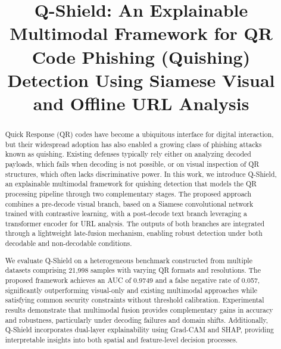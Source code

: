 \documentclass[conference]{IEEEtran}
\begin{document}
\title{Q-Shield: An Explainable Multimodal Framework for QR Code Phishing (Quishing) Detection Using Siamese Visual and Offline  URL Analysis}

\author{
\and
{}
\and
{}
}

\maketitle

\begin{abstract}
Quick Response (QR) codes have become a ubiquitous interface for digital interaction, but their widespread adoption has also enabled a growing class of phishing attacks known as quishing. Existing defenses typically rely either on analyzing decoded payloads, which fails when decoding is not possible, or on visual inspection of QR structures, which often lacks discriminative power. In this work, we introduce Q-Shield, an explainable multimodal framework for quishing detection that models the QR processing pipeline through two complementary stages. The proposed approach combines a pre-decode visual branch, based on a Siamese convolutional network trained with contrastive learning, with a post-decode text branch leveraging a transformer encoder for URL analysis. The outputs of both branches are integrated through a lightweight late-fusion mechanism, enabling robust detection under both decodable and non-decodable conditions.

We evaluate Q-Shield on a heterogeneous benchmark constructed from multiple datasets comprising 21,998 samples with varying QR formats and resolutions. The proposed framework achieves an AUC of 0.9749 and a false negative rate of 0.057, significantly outperforming visual-only and existing multimodal approaches while satisfying common security constraints without threshold calibration. Experimental results demonstrate that multimodal fusion provides complementary gains in accuracy and robustness, particularly under decoding failures and domain shifts. Additionally, Q-Shield incorporates dual-layer explainability using Grad-CAM and SHAP, providing interpretable insights into both spatial and feature-level decision processes.
\end{abstract}
\end{document}

